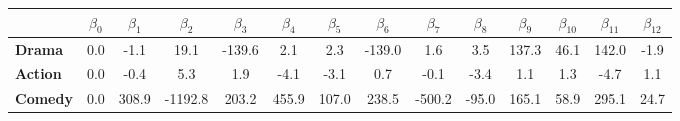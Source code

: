 \begin{tabular}{|l|c|c|c|c|c|c|c|c|c|c|c|c|c|}
\hline
&\textbf{$\beta_{0}$}&\textbf{$\beta_{1}$}&\textbf{$\beta_{2}$}&\textbf{$\beta_{3}$}&\textbf{$\beta_{4}$}&\textbf{$\beta_{5}$}&\textbf{$\beta_{6}$}&\textbf{$\beta_{7}$}&\textbf{$\beta_{8}$}&\textbf{$\beta_{9}$}&\textbf{$\beta_{10}$}&\textbf{$\beta_{11}$}&\textbf{$\beta_{12}$}\\\hline
\textbf{Drama}&0.0&-1.1&19.1&-139.6&2.1&2.3&-139.0&1.6&3.5&137.3&46.1&142.0&-1.9\\\hline
\textbf{Action}&0.0&-0.4&5.3&1.9&-4.1&-3.1&0.7&-0.1&-3.4&1.1&1.3&-4.7&1.1\\\hline
\textbf{Comedy}&0.0&308.9&-1192.8&203.2&455.9&107.0&238.5&-500.2&-95.0&165.1&58.9&295.1&24.7\\\hline
\end{tabular}
